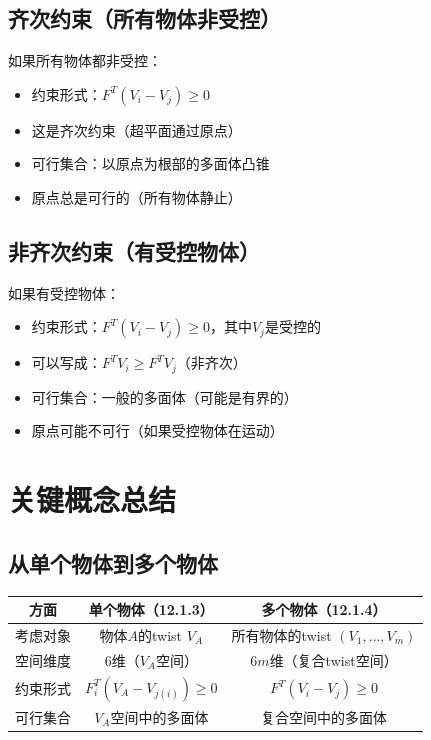 \documentclass[12pt,a4paper]{article}
\begin{document}
\subsection{齐次约束（所有物体非受控）}

如果所有物体都非受控：
\begin{itemize}
\item 约束形式：$F^T (V_i - V_j) \geq 0$
\item 这是齐次约束（超平面通过原点）
\item 可行集合：以原点为根部的多面体凸锥
\item 原点总是可行的（所有物体静止）
\end{itemize}

\subsection{非齐次约束（有受控物体）}

如果有受控物体：
\begin{itemize}
\item 约束形式：$F^T (V_i - V_j) \geq 0$，其中$V_j$是受控的
\item 可以写成：$F^T V_i \geq F^T V_j$（非齐次）
\item 可行集合：一般的多面体（可能是有界的）
\item 原点可能不可行（如果受控物体在运动）
\end{itemize}

\section{关键概念总结}

\subsection{从单个物体到多个物体}

\begin{center}
\begin{tabular}{|c|c|c|}
\hline
\textbf{方面} & \textbf{单个物体（12.1.3）} & \textbf{多个物体（12.1.4）} \\
\hline
考虑对象 & 物体$A$的twist $V_A$ & 所有物体的twist $(V_1, \ldots, V_m)$ \\
\hline
空间维度 & 6维（$V_A$空间） & $6m$维（复合twist空间） \\
\hline
约束形式 & $F_i^T (V_A - V_{j(i)}) \geq 0$ & $F^T (V_i - V_j) \geq 0$ \\
\hline
可行集合 & $V_A$空间中的多面体 & 复合空间中的多面体 \\
\hline
\end{tabular}
\end{center}
\end{document}
